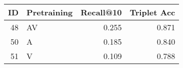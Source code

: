 \begin{tabular}{rlrr}
\toprule
 ID & Pretraining &  Recall@10 &  Triplet Acc \\
\midrule
 48 &          AV &      0.255 &        0.871 \\
 50 &           A &      0.185 &        0.840 \\
 51 &           V &      0.109 &        0.788 \\
\bottomrule
\end{tabular}
